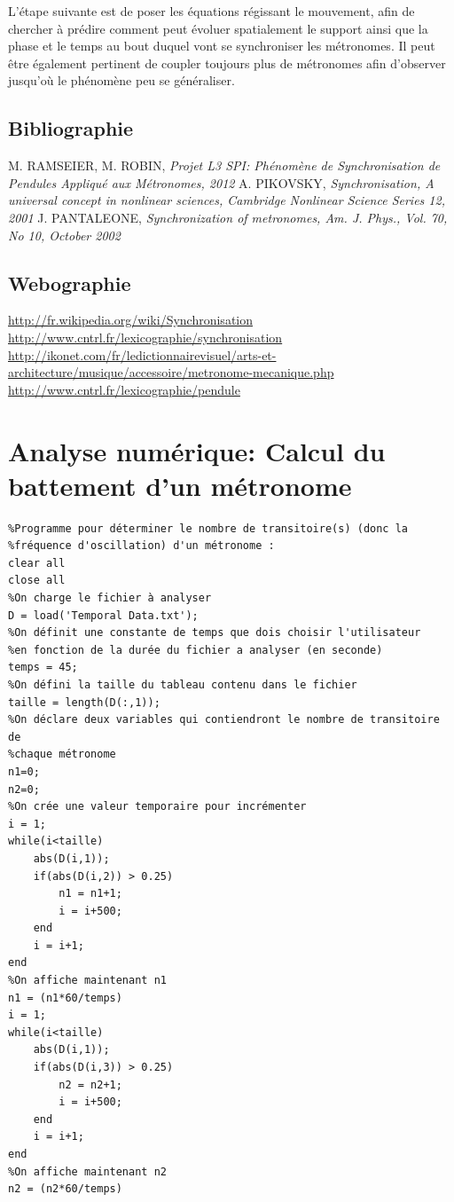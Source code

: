 \documentclass[a4paper,11pt]{report}
\begin{document}
L'étape suivante est de poser les équations régissant le mouvement, afin de chercher à prédire comment peut évoluer spatialement le support ainsi que la phase et le temps au bout duquel vont se synchroniser les métronomes. Il peut être également pertinent de coupler toujours plus de métronomes afin d'observer jusqu'où le phénomène peu se généraliser.
\renewcommand{\bibname}{Références}
\begin{thebibliography}{2}
\section*{Bibliographie}
 M. RAMSEIER, M. ROBIN, {\it Projet L3 SPI: Phénomène de Synchronisation de Pendules Appliqué aux Métronomes, 2012}
 A. PIKOVSKY, {\it Synchronisation, A universal concept in nonlinear sciences, Cambridge Nonlinear Science Series 12, 2001}
 J. PANTALEONE, {\it Synchronization of metronomes, Am. J. Phys., Vol. 70, No 10, October 2002}
\section*{Webographie}
 \url{http://fr.wikipedia.org/wiki/Synchronisation}
 \url{http://www.cntrl.fr/lexicographie/synchronisation}
 \url{http://ikonet.com/fr/ledictionnairevisuel/arts-et-architecture/musique/accessoire/metronome-mecanique.php}
 \url{http://www.cntrl.fr/lexicographie/pendule}
\end{thebibliography}
\appendix
\chapter{Analyse numérique: Calcul du battement d'un métronome}
\label{Battements}
\begin{verbatim}
%Programme pour déterminer le nombre de transitoire(s) (donc la 
%fréquence d'oscillation) d'un métronome :
clear all
close all
%On charge le fichier à analyser
D = load('Temporal Data.txt');
%On définit une constante de temps que dois choisir l'utilisateur 
%en fonction de la durée du fichier a analyser (en seconde)
temps = 45;
%On défini la taille du tableau contenu dans le fichier
taille = length(D(:,1));
%On déclare deux variables qui contiendront le nombre de transitoire de
%chaque métronome
n1=0;
n2=0;
%On crée une valeur temporaire pour incrémenter
i = 1;
while(i<taille)
    abs(D(i,1));
    if(abs(D(i,2)) > 0.25)
        n1 = n1+1;
        i = i+500;
    end
    i = i+1;
end
%On affiche maintenant n1
n1 = (n1*60/temps)
i = 1;
while(i<taille)
    abs(D(i,1));
    if(abs(D(i,3)) > 0.25)
        n2 = n2+1;
        i = i+500;
    end
    i = i+1;
end
%On affiche maintenant n2
n2 = (n2*60/temps)
\end{verbatim}
\end{document}
